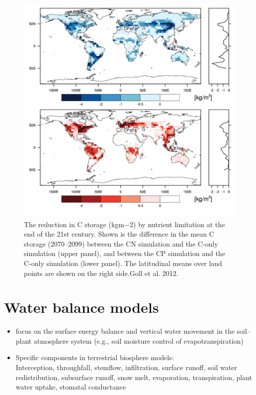 \documentclass[12pt,oneside]{book}
\begin{document}
\begin{figure}

{\centering \includegraphics[width=0.8\linewidth]{figures/chap5/f524_gool_sink_map} 

}

\caption{The reduction in C storage (kgm−2) by nutrient limitation at the end of the 21st century. Shown is the difference in the mean C storage (2070–2099) between the CN simulation and the C-only simulation (upper panel), and between the CP simulation and the C-only simulation (lower panel). The latitudinal means over land points are shown on the right side.Goll et al. 2012.}\label{fig:f524}
\end{figure}

\section{Water balance models}\label{water-balance-models}

\begin{itemize}
\item
  focus on the surface energy balance and vertical water movement in the
  soil--plant atmosphere system (e.g., soil moisture control of
  evapotranspiration)
\item
  Specific components in terrestrial biosphere models:\\
  Interception, throughfall, stemflow, infiltration, surface runoff,
  soil water redistribution, subsurface runoff, snow melt, evaporation,
  transpiration, plant water uptake, stomatal conductance
\end{itemize}
\end{document}

